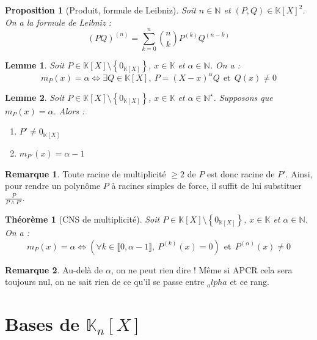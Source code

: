 \documentclass[french]{book}
\newcommand{\N}{\mathbb{N}}
\newcommand{\K}{\mathbb{K}}
\newcommand{\st}{^\star}
\theoremstyle{plain}
\newtheorem{thm}{Théorème}[chapter]
\newtheorem{lem}{Lemme}[chapter]
\newtheorem{prop}{Proposition}[chapter]
\theoremstyle{definition}
\newtheorem{rmq}{Remarque}[chapter]
\theoremstyle{remark}
\begin{document}
\begin{prop}[Produit, formule de Leibniz]
	Soit $n\in\N$ et $(P,Q)\in\K[X]^2$. On a la formule de Leibniz : $$(PQ)^{(n)}=\sum_{k=0}^{n}\binom{n}{k}P^{(k)}Q^{(n-k)}$$
\end{prop}
\begin{lem}
	Soit $P\in\K[X]\setminus\left\{0_{\K[X]}\right\}$, $x\in\K$ et $\alpha\in\N$. On a : $$m_P(x)=\alpha \Longleftrightarrow\exists Q\in\K[X],\ P=(X-x)^\alpha Q \ \ \text{et} \ \ Q(x)\ne 0$$
\end{lem}
\begin{lem}
	Soit $P\in\K[X]\setminus\left\{0_{\K[X]}\right\}$, $x\in\K$ et $\alpha\in\N\st$. Supposons que $m_P(x)=\alpha$. Alors : 
	\begin{enumerate}
		\item $P'\ne0_{\K[X]}$
		\item $m_{P'}(x)=\alpha-1$
	\end{enumerate}
\end{lem}
\begin{rmq}
	Toute racine de multiplicité $\geqslant2$ de $P$ est donc racine de $P'$. Ainsi, pour rendre un polynôme $P$ à racines simples de force, il suffit de lui substituer $\displaystyle \frac{P}{P\wedge P'}$.
\end{rmq}
\begin{thm}[CNS de multiplicité]
	Soit $P\in\K[X]\setminus\left\{0_{\K[X]}\right\}$, $x\in\K$ et $\alpha\in\N$. On a : $$m_P(x)=\alpha \Longleftrightarrow (\forall k\in\llbracket0,\alpha-1\rrbracket,\ P^{(k)}(x)=0) \ \ \text{et} \ \ P^{(\alpha)}(x)\ne 0$$
\end{thm}
\begin{rmq}
	Au-delà de $\alpha$, on ne peut rien dire ! Même si APCR cela sera toujours nul, on ne sait rien de ce qu'il se passe entre $_alpha$ et ce rang.
\end{rmq}
\section{Bases de $\K_n[X]$}
\end{document}
